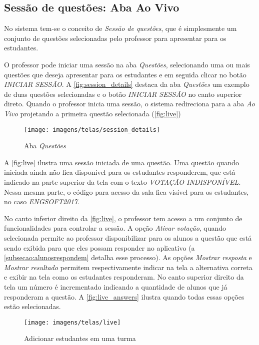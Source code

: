\subsection{Sessão de questões: Aba Ao Vivo}

No sistema tem-se o conceito de \textit{Sessão de questões}, que é
simplesmente um conjunto de questões selecionadas pelo professor
para apresentar para os estudantes.

O professor pode iniciar uma sessão na aba \textit{Questões}, selecionando
uma ou mais questões que deseja apresentar para os estudantes e
em seguida clicar no botão \textit{INICIAR SESSÃO}. A \autoref{fig:session_details}
destaca da aba \textit{Questões} um exemplo de duas questões selecionadas e o botão
\textit{INICIAR SESSÃO} no canto superior direto. Quando o professor inicia uma sessão,
o sistema redireciona para a aba \textit{Ao Vivo} projetando a primeira questão selecionada (\autoref{fig:live})

\begin{figure}[ht]
  \centering
  \caption{Aba \textit{Questões}}
  \texttt{[image: imagens/telas/session\_details]}
  \doautor
  \label{fig:session_details}
\end{figure}

A \autoref{fig:live} ilustra uma sessão iniciada de uma questão. Uma questão quando
iniciada ainda não fica disponível para os estudantes responderem, que está indicado
na parte superior da tela com o texto \textit{VOTAÇÃO INDISPONÍVEL}. Nessa mesma parte,
o código para acesso da sala fica visível para os estudantes, no caso \textit{ENGSOFT2017}.

No canto inferior direito da \autoref{fig:live}, o professor tem acesso a um conjunto de
funcionalidades para controlar a sessão. A opção \textit{Ativar votação}, quando selecionada
permite ao professor disponibilizar para os alunos a questão que está sendo exibida para que
eles possam responder no aplicativo (a \autoref{subsecao:alunosrespondem} detalha esse processo).
As opções \textit{Mostrar resposta} e \textit{Mostrar resultado} permitem respectivamente indicar
na tela a alternativa correta e exibir na tela como os estudantes responderam.
No canto superior direito da tela um número é incrementado indicando a quantidade de
alunos que já responderam a questão. A \autoref{fig:live_answers} ilustra quando
todas essas opções estão selecionadas.

\begin{figure}[ht]
  \centering
  \caption{Adicionar estudantes em uma turma}
  \texttt{[image: imagens/telas/live]}
  \doautor
  \label{fig:live}
\end{figure}

